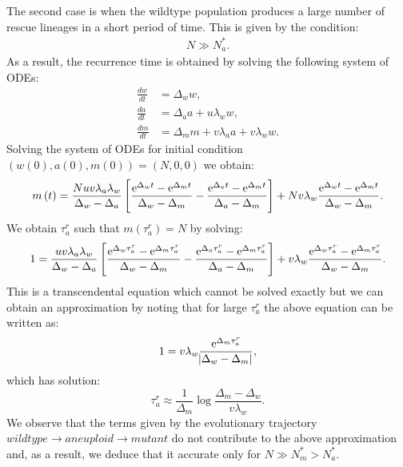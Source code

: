 \documentclass[12pt]{extarticle}
\newcommand{\e}{{\rm e}}
\begin{document}
\begin{appendices}
The second case is when the wildtype population produces a large number of rescue lineages in a short period of time. This is given by the condition:
\begin{align*}
N\gg N_a^*.
\end{align*}
As a result, the recurrence time is obtained by solving the following system of ODEs:
\begin{equation}\label{detODE}
\begin{aligned}
\frac{dw}{dt}&=\Delta_ww,\\
\frac{da}{dt}&=\Delta_aa+u\lambda_ww,\\
\frac{dm}{dt}&=\Delta_mm+v\lambda_aa+v\lambda_ww.
\end{aligned}
\end{equation}
Solving the system of ODEs for initial condition $\left(w(0), a(0), m(0)\right)=\left(N,0,0\right)$ we obtain:
\begin{align*}
m\left(t\right)=\frac{Nuv\lambda_a\lambda_w}{\Delta_w-\Delta_a}\left[\frac{\e^{\Delta_wt}-\e^{\Delta_mt}}{\Delta_w-\Delta_m}-\frac{\e^{\Delta_at}-\e^{\Delta_mt}}{\Delta_a-\Delta_m}\right]+Nv\lambda_w\frac{\e^{\Delta_wt}-\e^{\Delta_mt}}{\Delta_w-\Delta_m}.
\end{align*}
We obtain $\tau_a^r$ such that $m\left(\tau_a^r\right)=N$ by solving:
\begin{equation}%
1=\frac{uv\lambda_a\lambda_w}{\Delta_w-\Delta_a}\left[\frac{\e^{\Delta_w\tau_a^r}-\e^{\Delta_m\tau_a^r}}{\Delta_w-\Delta_m}-\frac{\e^{\Delta_a\tau_a^r}-\e^{\Delta_m\tau_a^r}}{\Delta_a-\Delta_m}\right]+v\lambda_w\frac{\e^{\Delta_w\tau_a^r}-\e^{\Delta_m\tau_a^r}}{\Delta_w-\Delta_m}.
\end{equation}
This is a transcendental equation which cannot be solved exactly but we can obtain an approximation by noting that for large $\tau_a^r$ the above equation can be written as: 
\begin{equation*}
1=v\lambda_w\frac{\e^{\Delta_m\tau_a^r}}{\abs{\Delta_w-\Delta_m}},
\end{equation*}
which has solution:
\begin{equation}\label{eq:t2det}
\tau_a^r\approx\frac{1}{\Delta_m}\log\frac{\Delta_m-\Delta_w}{v\lambda_w}.
\end{equation}
We observe that the terms given by the evolutionary trajectory $wildtype \rightarrow aneuploid \rightarrow mutant$ do not contribute to the above approximation and, as a result, we deduce that it accurate only for $N\gg N_m^*>N_a^*$.


\end{appendices}
\end{document}
